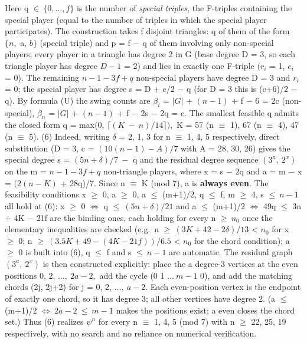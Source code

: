 \documentclass[
]{article}
\begin{document}
Here q \(\in\ \{0,\dots,f\}\) is the number of \emph{special triples},
the F-triples containing the special player (equal to the number of
triples in which the special player participates). The construction
takes f disjoint triangles: q of them of the form \(\{n,\) a, \(b\}\)
(special triple) and p = f \(-\) q of them involving only non-special
players; every player in a triangle has degree 2 in G (base degree D =
3, so each triangle player has degree \(D-1\) = 2) and lies in exactly
one F-triple \((r_i\) = 1, \(e_i\) = 0). The remaining \(n-1-3f+q\)
non-special players have degree D = 3 and \(r_i\) = 0; the special
player has degree s = D + c/2 \(-\) q (for D = 3 this is (c+6)/2 \(-\)
q). By formula (U) the swing counts are \(\beta_i\) = \(\vert G\vert\) +
\((n-1)\) + f \(-\) 6 = 2c (non-special), \(\beta_n\) = \(\vert G\vert\)
+ \((n-1)\) + f \(-\) 2s \(-\) 2q = c. The smallest feasible q admits
the closed form q = max(0, \(\lceil(K\ -\ n)/14\rceil),\) K = 57 (n
\(\equiv\) 1), 67 (n \(\equiv\) 4), 47 (n \(\equiv\) 5). (6) Indeed,
writing \(\delta\) = 2, 1, 3 for n \(\equiv\) 1, 4, 5 respectively,
direct substitution (D = 3, c = \((10(n-1)-A)/7\) with A = 28, 30, 26)
gives the special degree s = \((5n+\delta)/7\ -\) q and the residual
degree sequence \((3^a,\ 2^x)\) on the m = \(n-1-3f+q\) non-triangle
players, where x = s \(-\) 2q and a = m \(-\) x = \((2(n-K)\) + 28q)/7.
Since n \(\equiv\) K (mod 7), a is \textbf{always even}. The feasibility
conditions x \(\ge\) 0, a \(\ge\) 0, a \(\le\) (m+1)/2, q \(\le\) f, m
\(\ge\) 4, s \(\le\ n-1\) all hold at (6): x \(\ge\) 0 \(\iff\) q
\(\le\ (5n+\delta)/21\) and a \(\le\) (m+1)/2 \(\iff\) 49q \(\le\) 3n +
4K \(-\) 21f are the binding ones, each holding for every n \(\ge\ n_0\)
once the elementary inequalities are checked (e.g.~n
\(\ge\ (3K+42-2\delta)/13\) \textless{} \(n_0\) for x \(\ge\) 0; n
\(\ge\ (3.5K+49-(4K-21f))/6.5\) \textless{} \(n_0\) for the chord
condition); a \(\ge\) 0 is built into (6), q \(\le\) f and s
\(\le\ n-1\) are automatic. The residual graph \((3^a,\ 2^x)\) is then
constructed explicitly: place the a degree-3 vertices at the even
positions 0, 2, \(\dots,\ 2a-2,\) add the cycle (0 1 \(\dots\ m-1\) 0),
and add the matching chords (2j, 2j+2) for j = 0, 2, \(\dots,\ a-2.\)
Each even-position vertex is the endpoint of exactly one chord, so it
has degree 3; all other vertices have degree 2. (a \(\le\) (m+1)/2
\(\iff\ 2a-2\ \le\ m-1\) makes the positions exist; a even closes the
chord set.) Thus (6) realizes \(\psi^n\) for every n \(\equiv\) 1, 4, 5
(mod 7) with n \(\ge\) 22, 25, 19 respectively, with no search and no
reliance on numerical verification.
\end{document}
